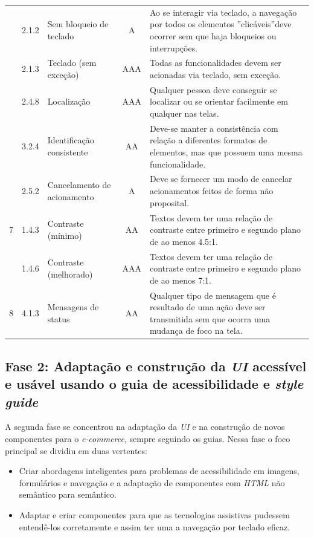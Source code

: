 {{\begin{minipage}{\linewidth}
{\begin{tabular}{|c|l|l|c|p{400px}|}
        \cline{2-5} & 2.1.2 & Sem bloqueio de teclado & A & Ao se interagir via teclado, a navegação por todos os elementos ”clicáveis”deve ocorrer sem que haja bloqueios ou interrupções.\\
        \cline{2-5} & 2.1.3 & Teclado (sem exceção) & AAA & Todas as funcionalidades devem ser acionadas via teclado, sem exceção.\\
        \cline{2-5} & 2.4.8 & Localização & AAA & Qualquer pessoa deve conseguir se localizar ou se orientar facilmente em qualquer nas telas.\\
        \cline{2-5} & 3.2.4 & Identificação consistente & AA & Deve-se manter a consistência com relação a diferentes formatos de elementos, mas que possuem uma mesma funcionalidade.\\
        \cline{2-5} & 2.5.2 & Cancelamento de acionamento & A & Deve se fornecer um modo de cancelar acionamentos feitos de forma não proposital.\\
    \hline
    7 & 1.4.3 & 
        Contraste (mínimo) & AA & Textos devem ter uma relação de contraste entre primeiro e segundo plano de ao menos 4.5:1.\\
        \cline{2-5} & 1.4.6 & Contraste (melhorado) & AAA & Textos devem ter uma relação de contraste entre primeiro e segundo plano de ao menos 7:1.\\
    \hline
    8 & 4.1.3 & 
        Mensagens de status & AA & Qualquer tipo de mensagem que é resultado de uma ação deve ser transmitida sem que ocorra uma mudança de foco na tela.\\
    \hline

\end{tabular}%
}
\label{elementos de UI}

\end{minipage}

}}


\subsection{Fase 2: Adaptação e construção da \textit{UI} acessível e usável usando o guia de acessibilidade e \textit{style guide}}
{A segunda fase se concentrou na adaptação da \textit{UI} e na construção de novos componentes para o \textit{e-commerce}, sempre seguindo os guias. Nessa fase o foco principal se dividiu em duas vertentes:
\begin{itemize}
\item Criar abordagens inteligentes para problemas de acessibilidade em imagens, formulários e navegação e a adaptação de componentes com \textit{HTML} \cite{HTML} não semântico para semântico.
\item  Adaptar e criar componentes para que as tecnologias assistivas pudessem entendê-los corretamente e assim ter uma a navegação por teclado eficaz.

\end{itemize}
}
